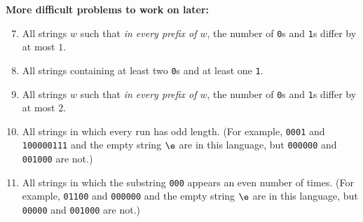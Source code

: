 \documentclass[11pt]{article}
\def\Sym#1{\texttt{\color{BrickRed}#1}}
\begin{document}
\noindent\textbf{More difficult problems to work on later:}

\begin{enumerate}
\setcounter{enumi}{6}

\item
All strings $w$ such that \emph{in every prefix of $w$}, the number of \Sym0s and \Sym1s differ by at most $1$.

\Hard
\item
All strings containing at least two \Sym0s and at least one \Sym1.

\Hard
\item
All strings $w$ such that \emph{in every prefix of $w$}, the number of \Sym0s and \Sym1s differ by at most $2$.

\item
All strings in which every run has odd length.  (For example, \Sym{0001} and \Sym{100000111} and the empty string $\e$ are in this language, but \Sym{000000} and \Sym{001000} are not.)

\ReallyHard
\item
All strings in which the substring \Sym{000} appears an even number of times.
(For example, \Sym{01100} and \Sym{000000} and the empty string $\e$ are in this language, but \Sym{00000} and \Sym{001000} are not.)

\end{enumerate}
\end{document}
